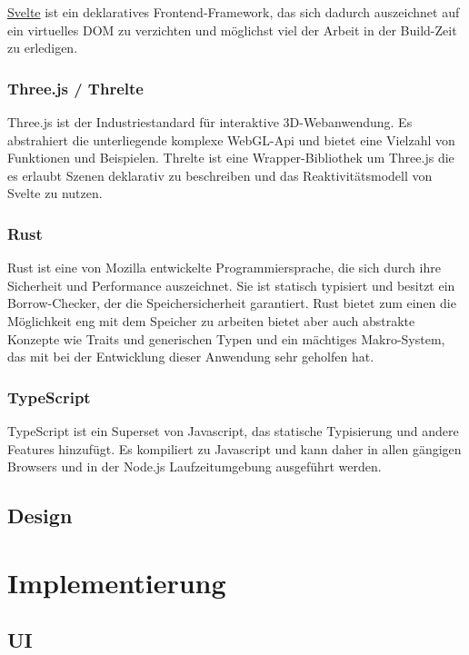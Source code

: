 \documentclass[ngerman]{article}
\begin{document}
\href{https://svelte.dev/}{Svelte} ist ein deklaratives Frontend-Framework, das sich dadurch auszeichnet auf ein virtuelles DOM zu verzichten und möglichst viel der Arbeit in der Build-Zeit zu erledigen.

\subsubsection{Three.js / Threlte}

Three.js ist der Industriestandard für interaktive 3D-Webanwendung. Es abstrahiert die unterliegende komplexe WebGL-Api und bietet eine Vielzahl von Funktionen und Beispielen. Threlte ist eine Wrapper-Bibliothek um Three.js die es erlaubt Szenen deklarativ zu beschreiben und das Reaktivitätsmodell von Svelte zu nutzen.

\subsubsection{Rust}
\label{sec:Rust}

Rust ist eine von Mozilla entwickelte Programmiersprache, die sich durch ihre Sicherheit und Performance auszeichnet. Sie ist statisch typisiert und besitzt ein Borrow-Checker, der die Speichersicherheit garantiert. \cite{Jung_2020} Rust bietet zum einen die Möglichkeit eng mit dem Speicher zu arbeiten bietet aber auch abstrakte Konzepte wie Traits und generischen Typen und ein mächtiges Makro-System, das mit bei der Entwicklung dieser Anwendung sehr geholfen hat.

\subsubsection{TypeScript}
\label{sec:TypeScript}
TypeScript ist ein Superset von Javascript, das statische Typisierung und andere Features hinzufügt. Es kompiliert zu Javascript und kann daher in allen gängigen Browsers und in der Node.js Laufzeitumgebung ausgeführt werden.
\subsection{Design}

\section{Implementierung}
\subsection{UI}
\end{document}
